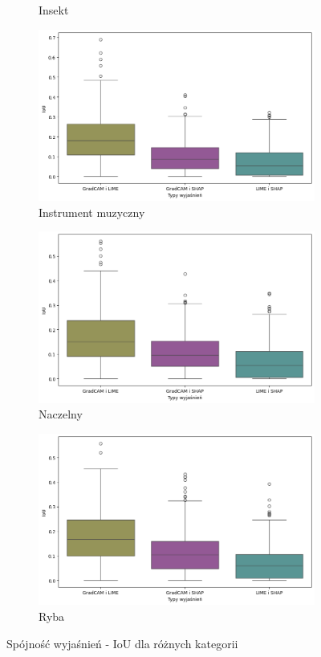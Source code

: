 \begin{figure}[!h]
\begin{subfigure}[b]{0.3\textwidth}
		\caption{Insekt}  \label{}
	\end{subfigure}
	\begin{subfigure}[b]{0.3\textwidth}
		\centering\includegraphics[width=.9\textwidth]{img/base_coherence_music}
		\caption{Instrument muzyczny}  \label{}
	\end{subfigure}
	\begin{subfigure}[b]{0.3\textwidth}
		\centering\includegraphics[width=.9\textwidth]{img/base_coherence_primate}
		\caption{Naczelny}  \label{}
	\end{subfigure}
	\begin{subfigure}[b]{0.3\textwidth}
		\centering\includegraphics[width=.9\textwidth]{img/base_coherence_fish}
		\caption{Ryba}  \label{}
	\end{subfigure}
	\caption{Spójność wyjaśnień - IoU dla różnych kategorii}
	\label{rys:coherence_category}
\end{figure}

